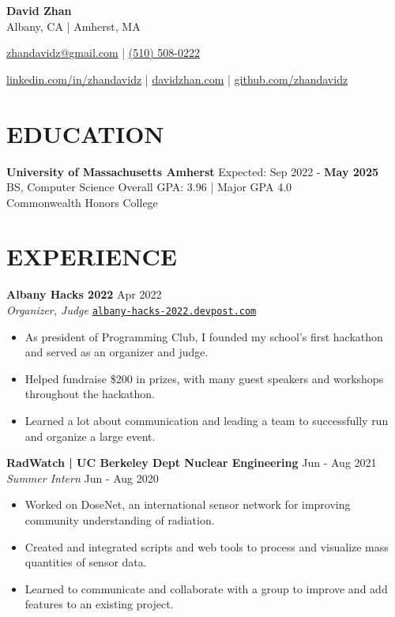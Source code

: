 \documentclass[letterpaper,10pt]{extarticle}
\begin{document}
\pagestyle{empty}

\begin{center}
\textbf{\Large David Zhan}\\[2pt] %
Albany, CA | Amherst, MA

\href{mailto:zhandavidz@gmail.com}{zhandavidz@gmail.com} | \href{tel:5105080222}{(510) 508-0222}

\href{https://www.linkedin.com/in/zhandavidz}{linkedin.com/in/zhandavidz} | \href{https://davidzhan.com}{davidzhan.com} | \href{https://github.com/zhandavidz}{github.com/zhandavidz}
\end{center}

\section*{EDUCATION}
\noindent
\textbf{University of Massachusetts Amherst} \hfill Expected: Sep 2022 - \textbf{May 2025}\\ %
BS, Computer Science \hfill Overall GPA: 3.96 | Major GPA 4.0\\ %
Commonwealth Honors College %

\section*{EXPERIENCE}
\noindent
\textbf{Albany Hacks 2022} \hfill Apr 2022\\ %
\textit{Organizer, Judge} \hfill \texttt{\href{https://albany-hacks-2022.devpost.com/}{albany-hacks-2022.devpost.com}} 
\begin{itemize}
    \item As president of Programming Club, I founded my school's first hackathon and served as an organizer and judge.
    \item Helped fundraise \$200 in prizes, with many guest speakers and workshops throughout the hackathon.
    \item Learned a lot about communication and leading a team to successfully run and organize a large event.
\end{itemize}

\noindent
\textbf{RadWatch | UC Berkeley Dept Nuclear Engineering} \hfill Jun - Aug 2021 \\
\textit{Summer Intern} \hfill Jun - Aug 2020
\begin{itemize}
    \item Worked on DoseNet, an international sensor network for improving community understanding of radiation.
    \item Created and integrated scripts and web tools to process and visualize mass quantities of sensor data.
    \item Learned to communicate and collaborate with a group to improve and add features to an existing project.
\end{itemize}
\end{document}
